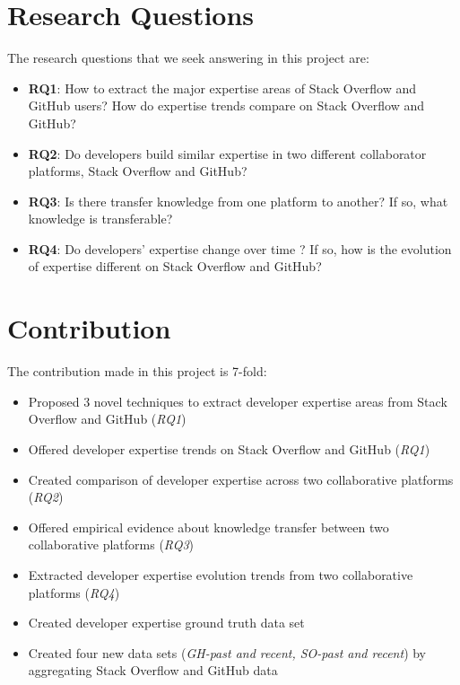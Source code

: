 \section{Research Questions}
    The research questions that we seek answering in this project are:

    \begin{itemize}
        \item \textbf{RQ1}: How to extract the major expertise areas of Stack Overflow and GitHub users? How do expertise trends compare on Stack Overflow and GitHub?
        \item \textbf{RQ2}: Do developers build similar expertise in two different collaborator platforms, Stack Overflow and GitHub?
        \item \textbf{RQ3}: Is there transfer knowledge from one platform to another? If so, what knowledge is transferable?
        \item \textbf{RQ4}: Do developers' expertise change over time ? If so, how is the evolution of expertise different on Stack Overflow and GitHub?
    \end{itemize}
    
\section{Contribution}
    The contribution made in this project is 7-fold:
    \begin{itemize}
        \item Proposed 3 novel techniques to extract developer expertise areas from Stack Overflow and GitHub (\emph{RQ1})
        \item Offered developer expertise trends on Stack Overflow and GitHub (\emph{RQ1})
        \item Created comparison of developer expertise across two collaborative platforms (\emph{RQ2})
        \item Offered empirical evidence about knowledge transfer between two collaborative platforms (\emph{RQ3})
        \item Extracted developer expertise evolution trends from two collaborative platforms (\emph{RQ4})
        \item Created developer expertise ground truth data set
        \item Created four new data sets (\emph{GH-past and recent, SO-past and recent}) by aggregating Stack Overflow and GitHub data
    \end{itemize}


